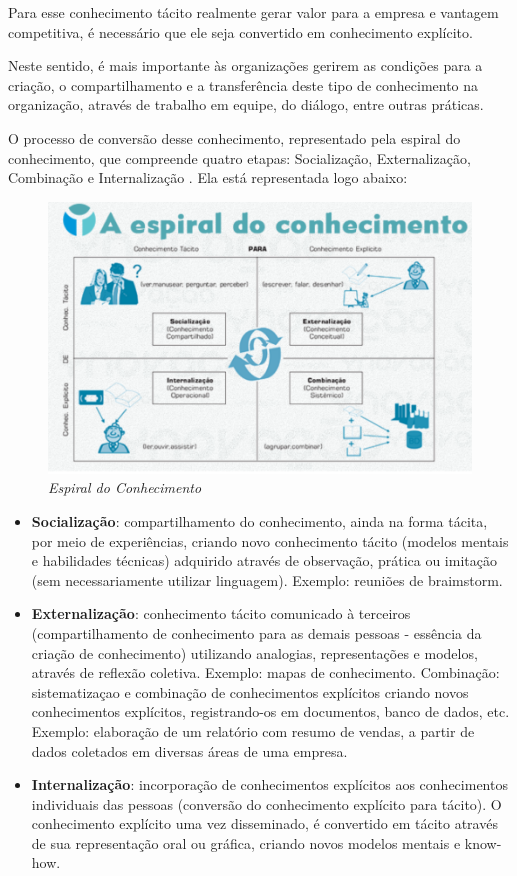 Para esse conhecimento tácito realmente gerar valor para a empresa e vantagem competitiva, é necessário que ele seja convertido em conhecimento explícito.

Neste sentido, é mais importante às organizações gerirem as condições para a criação, o compartilhamento e a transferência deste tipo de conhecimento na organização, através de trabalho em equipe, do diálogo, entre outras práticas.

O processo de conversão  desse conhecimento, representado pela espiral do conhecimento, que compreende quatro etapas: Socialização, Externalização, Combinação e Internalização \cite{nonaka}. Ela está representada logo abaixo:

\begin{figure}[H]
\centering\includegraphics[scale=0.5]{figuras/espiralConhecimento.png}
\caption{\textit{Espiral do Conhecimento}}
\end{figure}

\begin{itemize}
\item \textbf{Socialização}: compartilhamento do conhecimento, ainda na forma tácita, por meio de experiências, criando novo conhecimento tácito (modelos mentais e habilidades técnicas) adquirido através de observação, prática ou imitação (sem necessariamente utilizar linguagem).  Exemplo: reuniões de braimstorm. 

\item \textbf{Externalização}: conhecimento tácito comunicado à terceiros (compartilhamento de conhecimento para as demais pessoas - essência da criação de conhecimento) utilizando analogias, representações e modelos, através de reflexão coletiva. Exemplo: mapas de conhecimento. 
Combinação: sistematizaçao e combinação de conhecimentos explícitos criando novos conhecimentos explícitos, registrando-os em documentos, banco de dados, etc. Exemplo: elaboração de um relatório com resumo de vendas, a partir de dados coletados em diversas áreas de uma empresa.
\item \textbf{Internalização}: incorporação de conhecimentos explícitos aos conhecimentos individuais das pessoas (conversão do conhecimento explícito para tácito). O conhecimento explícito uma vez disseminado, é convertido em tácito através de sua representação oral ou gráfica, criando novos modelos mentais e know-how. 
\end{itemize}

